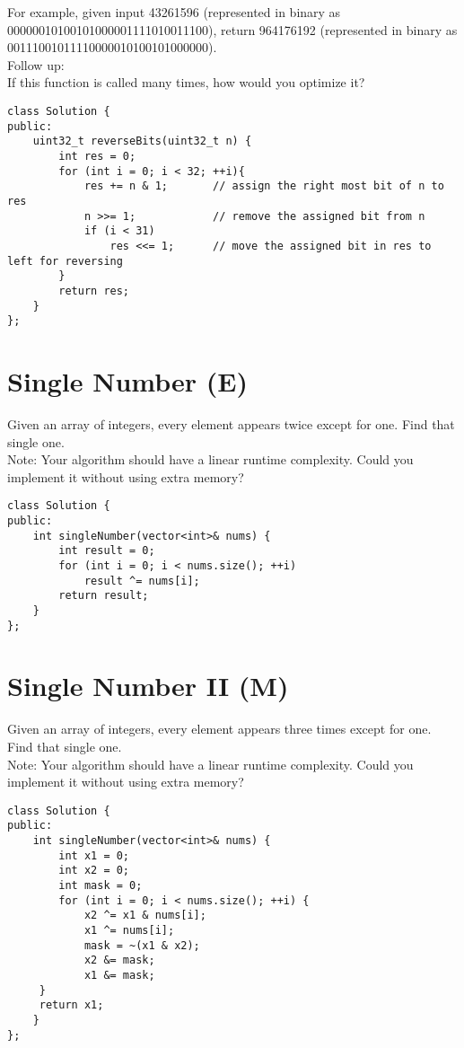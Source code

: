 For example, given input 43261596 (represented in binary as 00000010100101000001111010011100), return 964176192 (represented in binary as 00111001011110000010100101000000).\\

Follow up:\\
If this function is called many times, how would you optimize it? \\

\begin{lstlisting}
class Solution {
public:
    uint32_t reverseBits(uint32_t n) {
        int res = 0;
        for (int i = 0; i < 32; ++i){
            res += n & 1;       // assign the right most bit of n to res
            n >>= 1;            // remove the assigned bit from n
            if (i < 31)
                res <<= 1;      // move the assigned bit in res to left for reversing
        }
        return res;
    }
};
\end{lstlisting}


\section{Single Number (E)}
Given an array of integers, every element appears twice except for one. Find that single one.\\

Note: Your algorithm should have a linear runtime complexity. Could you implement it without using extra memory? \\

\begin{lstlisting}
class Solution {
public:
    int singleNumber(vector<int>& nums) {
        int result = 0;
        for (int i = 0; i < nums.size(); ++i)
            result ^= nums[i];
        return result;
    }
};
\end{lstlisting}


\section{Single Number II (M)}
Given an array of integers, every element appears three times except for one. Find that single one. \\

Note: Your algorithm should have a linear runtime complexity. Could you implement it without using extra memory? \\

\begin{lstlisting}
class Solution {
public:
    int singleNumber(vector<int>& nums) {
        int x1 = 0;   
        int x2 = 0; 
        int mask = 0;
        for (int i = 0; i < nums.size(); ++i) {
            x2 ^= x1 & nums[i];
            x1 ^= nums[i];
            mask = ~(x1 & x2);
            x2 &= mask;
            x1 &= mask;
     }
     return x1;
    }
};
\end{lstlisting}


